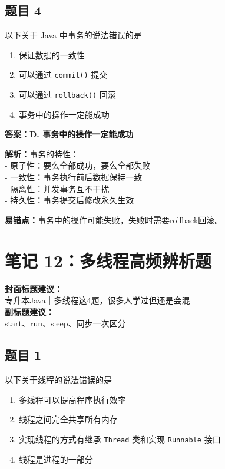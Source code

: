 \documentclass[12pt,a4paper]{ctexart}
\begin{document}
\subsection*{题目 4}
以下关于 Java 中事务的说法错误的是
\begin{enumerate}[label=\Alph*.]
	\item 保证数据的一致性
	\item 可以通过 \texttt{commit()} 提交
	\item 可以通过 \texttt{rollback()} 回滚
	\item 事务中的操作一定能成功
\end{enumerate}

\begin{answerbox}
	\textbf{答案：D. 事务中的操作一定能成功}

	\textbf{解析：}事务的特性：\\
	- 原子性：要么全部成功，要么全部失败\\
	- 一致性：事务执行前后数据保持一致\\
	- 隔离性：并发事务互不干扰\\
	- 持久性：事务提交后修改永久生效

	\textbf{易错点：}事务中的操作可能失败，失败时需要rollback回滚。
\end{answerbox}

\newpage

\section{笔记 12：多线程高频辨析题}
\begin{coverbox}
	\textbf{封面标题建议：}\\
	专升本Java｜多线程这4题，很多人学过但还是会混\\
	\textbf{副标题建议：}\\
	start、run、sleep、同步一次区分
\end{coverbox}

\subsection*{题目 1}
以下关于线程的说法错误的是
\begin{enumerate}[label=\Alph*.]
	\item 多线程可以提高程序执行效率
	\item 线程之间完全共享所有内存
	\item 实现线程的方式有继承 \texttt{Thread} 类和实现 \texttt{Runnable} 接口
	\item 线程是进程的一部分
\end{enumerate}
\end{document}
